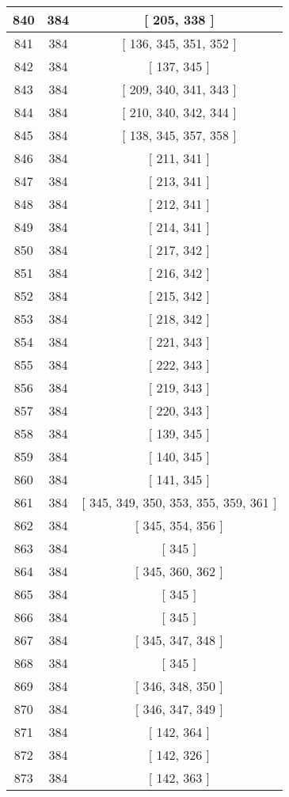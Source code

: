\begin{center}
\begin{longtable}[H]{|| c c c ||}
\hline
840 & 384 & [ 205, 338 ] \\ 
\hline
841 & 384 & [ 136, 345, 351, 352 ] \\ 
\hline
842 & 384 & [ 137, 345 ] \\ 
\hline
843 & 384 & [ 209, 340, 341, 343 ] \\ 
\hline
844 & 384 & [ 210, 340, 342, 344 ] \\ 
\hline
845 & 384 & [ 138, 345, 357, 358 ] \\ 
\hline
846 & 384 & [ 211, 341 ] \\ 
\hline
847 & 384 & [ 213, 341 ] \\ 
\hline
848 & 384 & [ 212, 341 ] \\ 
\hline
849 & 384 & [ 214, 341 ] \\ 
\hline
850 & 384 & [ 217, 342 ] \\ 
\hline
851 & 384 & [ 216, 342 ] \\ 
\hline
852 & 384 & [ 215, 342 ] \\ 
\hline
853 & 384 & [ 218, 342 ] \\ 
\hline
854 & 384 & [ 221, 343 ] \\ 
\hline
855 & 384 & [ 222, 343 ] \\ 
\hline
856 & 384 & [ 219, 343 ] \\ 
\hline
857 & 384 & [ 220, 343 ] \\ 
\hline
858 & 384 & [ 139, 345 ] \\ 
\hline
859 & 384 & [ 140, 345 ] \\ 
\hline
860 & 384 & [ 141, 345 ] \\ 
\hline
861 & 384 & [ 345, 349, 350, 353, 355, 359, 361 ] \\ 
\hline
862 & 384 & [ 345, 354, 356 ] \\ 
\hline
863 & 384 & [ 345 ] \\ 
\hline
864 & 384 & [ 345, 360, 362 ] \\ 
\hline
865 & 384 & [ 345 ] \\ 
\hline
866 & 384 & [ 345 ] \\ 
\hline
867 & 384 & [ 345, 347, 348 ] \\ 
\hline
868 & 384 & [ 345 ] \\ 
\hline
869 & 384 & [ 346, 348, 350 ] \\ 
\hline
870 & 384 & [ 346, 347, 349 ] \\ 
\hline
871 & 384 & [ 142, 364 ] \\ 
\hline
872 & 384 & [ 142, 326 ] \\ 
\hline
873 & 384 & [ 142, 363 ] \\ 

\end{longtable}
\end{center}
